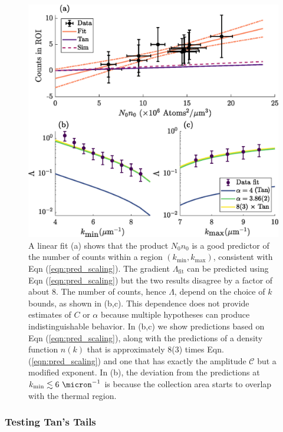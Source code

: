 	\begin{figure}[t]
	\begin{center}
		\includegraphics[width=\columnwidth]{fig/depletion/exp_results}
			\caption{A linear fit (a) shows that the product $N_0n_0$ is a good predictor of the number of counts within a region $(k_\textrm{min},k_\textrm{max})$, consistent with Eqn (\ref{eqn:pred_scaling}). The gradient $\Lambda_\textrm{fit}$ can be predicted using Eqn (\ref{eqn:pred_scaling}) but the two results disagree by a factor of about 8. The number of counts, hence $\Lambda$, depend on the choice of $k$ bounds, as shown in (b,c). This dependence does not provide estimates of $C$ or $\alpha$ because multiple hypotheses can produce indistinguishable behavior. In (b,c) we show predictions based on Eqn (\ref{eqn:pred_scaling}), along with the predictions of a density function $n(k)$ that is approximately 8(3) times Eqn. (\ref{eqn:pred_scaling}) and one that has exactly the amplitude $\mathcal{C}$ but a modified exponent. In (b), the deviation from the predictions at $k_\textrm{min}\lesssim6~\micron^{-1}$ is because the collection area starts to overlap with the thermal region.
			}

		\label{fig:exp_results}
	\end{center}
	\end{figure}

\subsubsection{Testing Tan's Tails}

